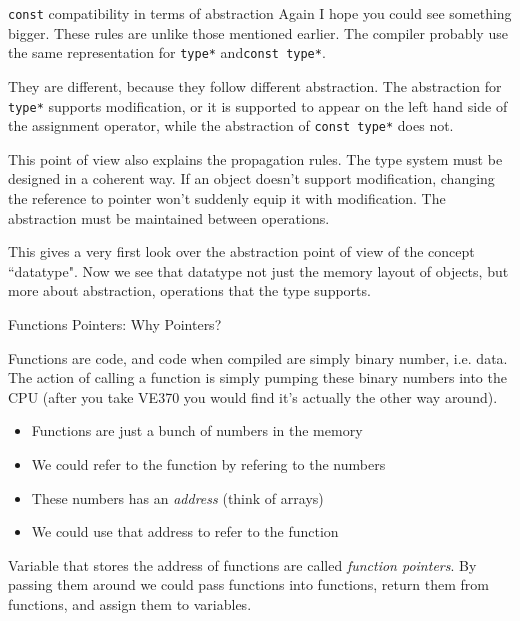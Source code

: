 \begin{frame}{\texttt{const} compatibility in terms of abstraction}
\small
Again I hope you could see something bigger. These rules are unlike those mentioned earlier. The compiler probably use the same representation for \texttt{type*} and\texttt{const type*}. 

They are different, because they follow different abstraction. The abstraction for \texttt{type*} supports modification, or it is supported to appear on the left hand side of the assignment operator, while the abstraction of \texttt{const type*} does not. 

This point of view also explains the propagation rules. The type system must be designed in a coherent way. If an object doesn't support modification, changing the reference to pointer won't suddenly equip it with modification. The abstraction must be maintained between operations.

This gives a very first look over the abstraction point of view of the concept ``datatype". Now we see that datatype not just the memory layout of objects, but more about abstraction, operations that the type supports.

\end{frame}



\begin{frame}{Functions Pointers: Why Pointers?}

	
	Functions are code, and code when compiled are simply binary number, i.e. data. The action of calling a function is simply pumping these binary numbers into the CPU (after you take VE370 you would find it's actually the other way around).
	
	\begin{itemize}
		\item Functions are just a bunch of numbers in the memory
		\item We could refer to the function by refering to the numbers
		\item These numbers has an \textit{address} (think of arrays)
		\item We could use that address to refer to the function
	\end{itemize}
	
	Variable that stores the address of functions are called \textit{function pointers}. By passing them around we could pass functions into functions, return them from functions, and assign them to variables. 
\end{frame}

